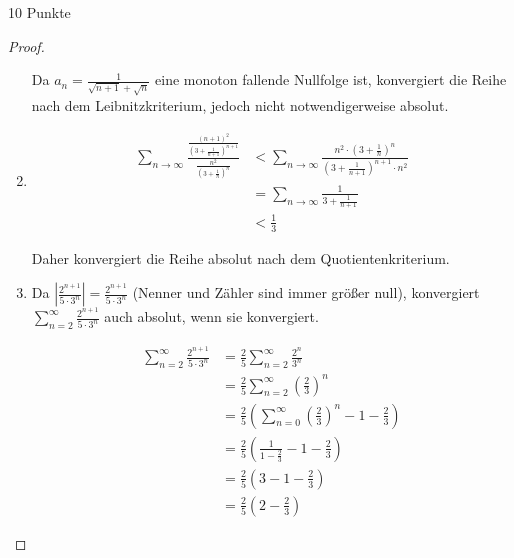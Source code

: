 \documentclass{problemset}
\begin{document}
\begin{problem}{10 Punkte}
\begin{proof}
\begin{enumerate}
              Da $a_n = \frac{1}{\sqrt{n + 1} + \sqrt{n}}$ eine monoton
              fallende Nullfolge ist, konvergiert die Reihe nach dem
              Leibnitzkriterium, jedoch nicht notwendigerweise absolut. \item
              \begin{align*}
                  \sum_{n \to \infty} \frac{\frac{{(n+1)}^2}{{(3 + \frac{1}{n+1})}^{n+1}}}{\frac{n^2}{{(3 + \frac{1}{n})}^n}} & < \sum_{n \to \infty} \frac{n^2 \cdot {(3 + \frac{1}{n})}^n}{{(3 + \frac{1}{n+1})}^{n+1} \cdot n^2} \\
                                                                                                                              & = \sum_{n \to \infty} \frac{1}{3 + \frac{1}{n+1}}                                                   \\
                                                                                                                              & < \frac{1}{3}
              \end{align*}

              Daher konvergiert die Reihe absolut nach dem Quotientenkriterium.

        \item Da $\left|\frac{2^{n+1}}{5 \cdot 3^n} \right| = \frac{2^{n+1}}{5
              \cdot 3^n}$ (Nenner und Zähler sind immer größer null),
              konvergiert $\sum_{n=2}^{\infty} \frac{2^{n+1}}{5 \cdot 3^n}$
              auch absolut, wenn sie konvergiert.

              \begin{align*}
                  \sum_{n=2}^{\infty} \frac{2^{n+1}}{5 \cdot 3^n} & = \frac{2}{5} \sum_{n=2}^{\infty} \frac{2^n}{3^n}                                                \\
                                                                  & = \frac{2}{5} \sum_{n=2}^{\infty} {\left(\frac{2}{3}\right)}^{n}                                 \\
                                                                  & = \frac{2}{5} \left(\sum_{n=0}^{\infty} {\left(\frac{2}{3}\right)}^{n} - 1 - \frac{2}{3} \right) \\
                                                                  & = \frac{2}{5} \left(\frac{1}{1 - \frac{2}{3}} - 1 - \frac{2}{3}\right)                           \\
                                                                  & = \frac{2}{5} \left(3 - 1 - \frac{2}{3}\right)                                                   \\
                                                                  & = \frac{2}{5} \left(2 - \frac{2}{3}\right)
              \end{align*}


\end{enumerate}
\end{proof}
\end{problem}
\end{document}
